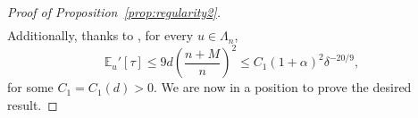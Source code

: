 \documentclass[11pt,a4paper]{article}
\numberwithin{equation}{section}
\theoremstyle{plain}
\theoremstyle{definition}
\begin{document}
\begin{proof}[Proof of Proposition~\textup{\ref{prop:regularity2}}]
\begin{multline}
\end{multline}
Additionally, thanks to \cite[Proposition~A.5]{DumPan24Perco}, for every $u\in \Lambda_n$,
\begin{equation}\label{eq:proof propreg2 2}
	\mathbb E_u'[\tau]\leq 9d\left(\frac{n+M}{n}\right)^2\leq C_1(1+\alpha)^2\delta^{-20/9},
\end{equation}
for some $C_1=C_1(d)>0$.
%
We are now in a position to prove the desired result.


\end{proof}
\end{document}
